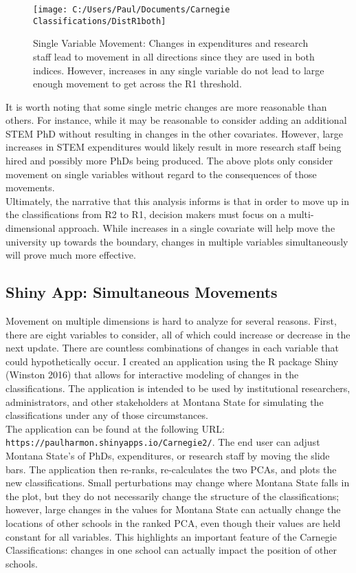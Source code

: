 \documentclass{article}
\begin{document}
  \begin{figure}
    \centering
      \texttt{[image: C:/Users/Paul/Documents/Carnegie Classifications/DistR1both]}
      \captionsetup{font=footnotesize,labelfont=footnotesize}
   \caption{\label{fig:agb} }{Single Variable Movement: Changes in expenditures and research staff lead to movement in all directions since they are used in both indices. However, increases in any single variable do not lead to large enough movement to get across the R1 threshold.}
   
  \end{figure}


It is worth noting that some single metric changes are more reasonable than others. For instance, while it may be reasonable to consider adding an additional STEM PhD without resulting in changes in the other covariates. However, large increases in STEM expenditures would likely result in more research staff being hired and possibly more PhDs being produced. The above plots only consider movement on single variables without regard to the consequences of those movements.\\  
Ultimately, the narrative that this analysis informs is that in order to move up in the classifications from R2 to R1, decision makers must focus on a multi-dimensional approach. While increases in a single covariate will help move the university up towards the boundary, changes in multiple variables simultaneously will prove much more effective. 


\subsection{Shiny App: Simultaneous Movements}
Movement on multiple dimensions is hard to analyze for several reasons. First, there are eight variables to consider, all of which could increase or decrease in the next update. There are countless combinations of changes in each variable that could hypothetically occur. I created an application using the R package Shiny (Winston 2016) that allows for interactive modeling of changes in the classifications. The application is intended to be used by institutional researchers, administrators, and other stakeholders at Montana State for simulating the classifications under any of those circumstances. \\

The application can be found at the following URL: \texttt{https://paulharmon.shinyapps.io/Carnegie2/}. The end user can adjust Montana State's of PhDs, expenditures, or research staff by moving the slide bars. The application then re-ranks, re-calculates the two PCAs, and plots the new classifications. Small perturbations may change where Montana State falls in the plot, but they do not necessarily change the structure of the classifications; however, large changes in the values for Montana State can actually change the locations of other schools in the ranked PCA, even though their values are held constant for all variables.  This highlights an important feature of the Carnegie Classifications: changes in one school can actually impact the position of other schools. \\
\end{document}
